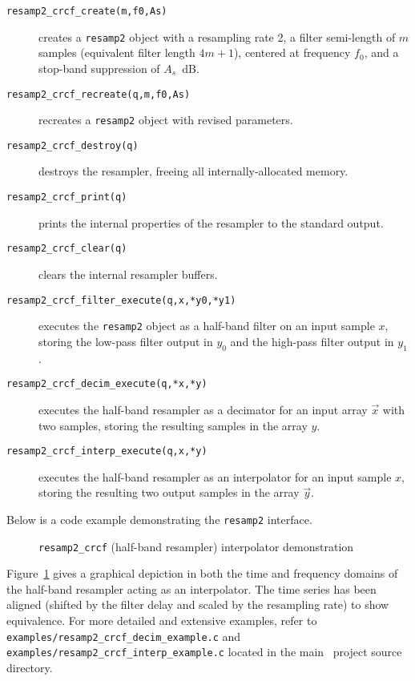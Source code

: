 \begin{description}
\item[{\tt resamp2\_crcf\_create(m,f0,As)}]
    creates a {\tt resamp2} object with a resampling rate 2,
    a filter semi-length of $m$ samples
    (equivalent filter length $4m+1$),
    centered at frequency $f_0$, and
    a stop-band suppression of $A_s$~dB.
\item[{\tt resamp2\_crcf\_recreate(q,m,f0,As)}]
    recreates a {\tt resamp2} object with revised parameters.
\item[{\tt resamp2\_crcf\_destroy(q)}]
    destroys the resampler, freeing all internally-allocated memory.
\item[{\tt resamp2\_crcf\_print(q)}]
    prints the internal properties of the resampler to the standard
    output.
\item[{\tt resamp2\_crcf\_clear(q)}]
    clears the internal resampler buffers.
\item[{\tt resamp2\_crcf\_filter\_execute(q,x,*y0,*y1)}]
    executes the {\tt resamp2} object as a half-band filter on an input
    sample $x$, storing the low-pass filter output in $y_0$ and the
    high-pass filter output in $y_1$.
\item[{\tt resamp2\_crcf\_decim\_execute(q,*x,*y)}]
    executes the half-band resampler as a decimator
    for an input array $\vec{x}$ with two samples,
    storing the resulting samples in the array $y$.
\item[{\tt resamp2\_crcf\_interp\_execute(q,x,*y)}]
    executes the half-band resampler as an interpolator
    for an input sample $x$,
    storing the resulting two output samples in the array $\vec{y}$.
\end{description}
%
Below is a code example demonstrating the {\tt resamp2} interface.
%

%
\begin{figure}
\centering
{}
\caption{{\tt resamp2\_crcf} (half-band resampler) interpolator demonstration}
\label{fig:module:filter:resamp2_crcf}
\end{figure}
%
Figure~\ref{fig:module:filter:resamp2_crcf} gives a graphical depiction
in both the time and frequency domains
of the half-band resampler acting as an interpolator.
The time series has been aligned (shifted by the filter delay and scaled by
the resampling rate) to show equivalence.
%
For more detailed and extensive examples, refer to
{\tt examples/resamp2\_crcf\_decim\_example.c} and
{\tt examples/resamp2\_crcf\_interp\_example.c}
located in the main \liquid\ project source directory.


